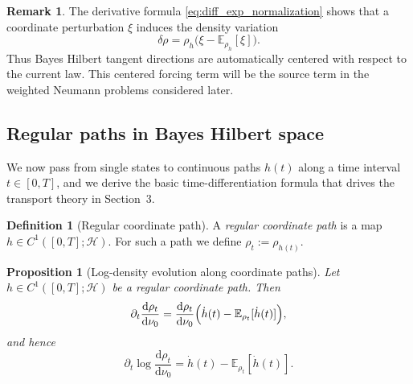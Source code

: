 \documentclass{article}
\newtheorem{proposition}[theorem]{Proposition}
\theoremstyle{definition}
\newtheorem{definition}[theorem]{Definition}
\newtheorem{remark}[theorem]{Remark}
\renewcommand{\d}{\mathrm{d}}
\begin{document}
\begin{remark}
    \label{rem:ambient_tangent_interpretation}
    The derivative formula \eqref{eq:diff_exp_normalization} shows that a coordinate perturbation
    \(\xi\) induces the density variation
    \[
        \delta \rho
        =
        \rho_h\bigl(\xi-\mathbb E_{\rho_h}[\xi]\bigr).
    \]
    Thus Bayes Hilbert tangent directions are automatically centered with respect to the current law.
    This centered forcing term will be the source term in the weighted Neumann problems considered
    later.
\end{remark}


\subsection{Regular paths in Bayes Hilbert space}
\label{subsec:regular-paths}

We now pass from single states to continuous paths $h(t)$ along a time interval $t \in [0, T]$, and we derive the basic time-differentiation formula that drives the transport theory in Section~3.

\begin{definition}[Regular coordinate path]
    A \emph{regular coordinate path} is a map \(h\in C^1([0,T]; \mathcal H)\).
    For such a path we define $\rho_t := \rho_{h(t)}.$
\end{definition}

\begin{proposition}[Log-density evolution along coordinate paths]
    \label{prop:ambient_log_density_evolution}
    Let \(h\in C^1([0,T];\mathcal H)\) be a regular coordinate path.
    Then
    \begin{equation}
        \label{eq:ambient_density_derivative}
        \partial_t \frac{\d\rho_t}{\d\nu_0}
        =
        \frac{\d\rho_t}{\d\nu_0}
        \Bigl(\dot h(t)-\mathbb E_{\rho_t}[\dot h(t)]\Bigr),
    \end{equation}
    and hence
    \begin{equation}
        \label{eq:ambient_log_density_derivative}
        \partial_t \log \frac{\d\rho_t}{\d\nu_0}
        =
        \dot h(t)-\mathbb E_{\rho_t}[\dot h(t)].
    \end{equation}
\end{proposition}
\end{document}
